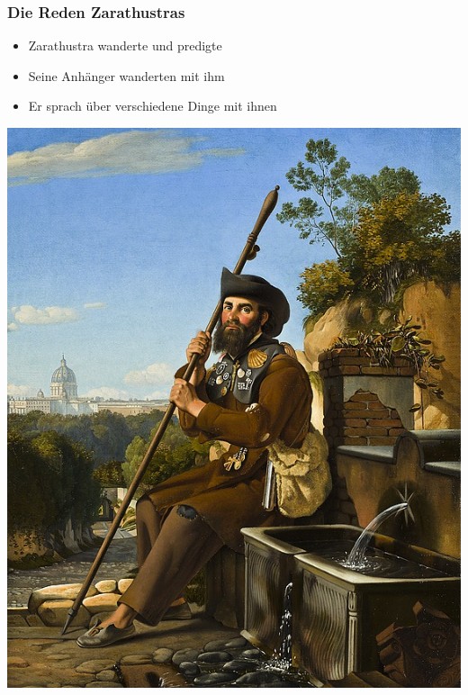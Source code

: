 \documentclass{beamer}
\begin{document}
\begin{frame}
\frametitle{Die Reden Zarathustras}
\begin{minipage}{.49\textwidth}
\begin{itemize}
\item Zarathustra wanderte und predigte
\item Seine Anhänger wanderten mit ihm
\item Er sprach über verschiedene Dinge mit ihnen
\end{itemize}
\end{minipage}
\begin{minipage}{.49\textwidth}
\includegraphics[width=\textwidth]{zarathustra.jpg}
\end{minipage}
\end{frame}
\end{document}
